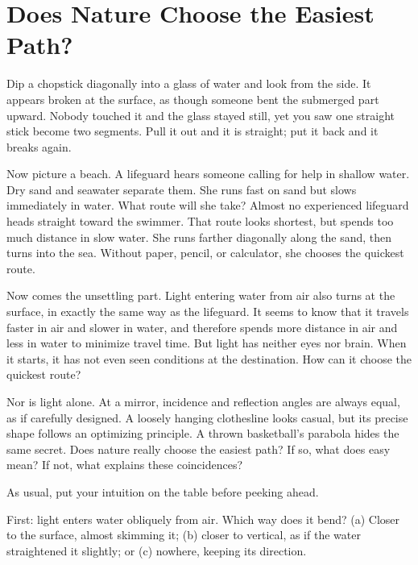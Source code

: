 \chapter{Does Nature Choose the Easiest Path?}


\begin{mainline}
Dip a chopstick diagonally into a glass of water and look from the side. It appears broken at the surface, as though someone bent the submerged part upward. Nobody touched it and the glass stayed still, yet you saw one straight stick become two segments. Pull it out and it is straight; put it back and it breaks again.

Now picture a beach. A lifeguard hears someone calling for help in shallow water. Dry sand and seawater separate them. She runs fast on sand but slows immediately in water. What route will she take? Almost no experienced lifeguard heads straight toward the swimmer. That route looks shortest, but spends too much distance in slow water. She runs farther diagonally along the sand, then turns into the sea. Without paper, pencil, or calculator, she chooses the quickest route.

Now comes the unsettling part. Light entering water from air also turns at the surface, in exactly the same way as the lifeguard. It seems to know that it travels faster in air and slower in water, and therefore spends more distance in air and less in water to minimize travel time. But light has neither eyes nor brain. When it starts, it has not even seen conditions at the destination. How can it choose the quickest route?

Nor is light alone. At a mirror, incidence and reflection angles are always equal, as if carefully designed. A loosely hanging clothesline looks casual, but its precise shape follows an optimizing principle. A thrown basketball's parabola hides the same secret. Does nature really choose the easiest path? If so, what does easy mean? If not, what explains these coincidences?
\end{mainline}


As usual, put your intuition on the table before peeking ahead.

First: light enters water obliquely from air. Which way does it bend? (a) Closer to the surface, almost skimming it; (b) closer to vertical, as if the water straightened it slightly; or (c) nowhere, keeping its direction.

